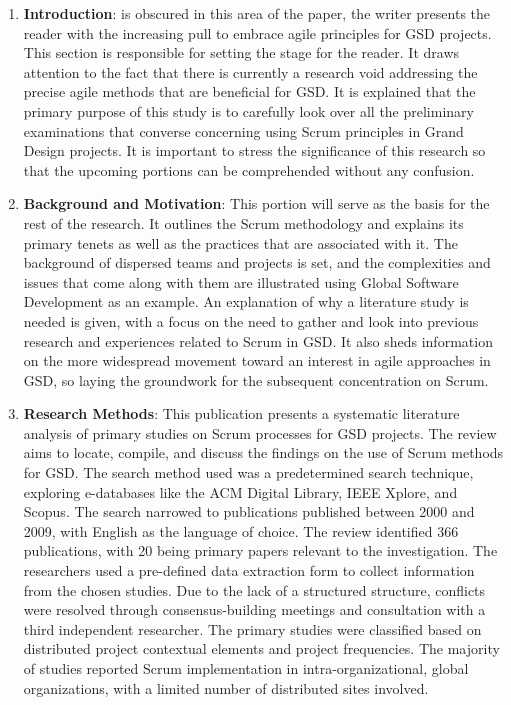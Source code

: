 \documentclass[conference]{IEEEtran}
\begin{document}
\begin{enumerate}
    \item \textbf{Introduction}: is obscured in this area of the paper, the writer presents the reader with the increasing pull to embrace agile principles for GSD projects. This section is responsible for setting the stage for the reader. It draws attention to the fact that there is currently a research void addressing the precise agile methods that are beneficial for GSD. It is explained that the primary purpose of this study is to carefully look over all the preliminary examinations that converse concerning using Scrum principles in Grand Design projects. It is important to stress the significance of this research so that the upcoming portions can be comprehended without any confusion.
\newline
\item \textbf{Background and Motivation}: This portion will serve as the basis for the rest of the research. It outlines the Scrum methodology and explains its primary tenets as well as the practices that are associated with it. The background of dispersed teams and projects is set, and the complexities and issues that come along with them are illustrated using Global Software Development as an example. An explanation of why a literature study is needed is given, with a focus on the need to gather and look into previous research and experiences related to Scrum in GSD. It also sheds information on the more widespread movement toward an interest in agile approaches in GSD, so laying the groundwork for the subsequent concentration on Scrum.
\newline
\item \textbf{Research Methods}: This publication presents a systematic literature analysis of primary studies on Scrum processes for GSD projects. The review aims to locate, compile, and discuss the findings on the use of Scrum methods for GSD. The search method used was a predetermined search technique, exploring  e-databases like the ACM Digital Library, IEEE Xplore, and Scopus. The search narrowed to publications published between 2000 and 2009, with English as the language of choice. The review identified 366 publications, with 20 being primary papers relevant to the investigation. The researchers used a pre-defined data extraction form to collect information from the chosen studies. Due to the lack of a structured structure, conflicts were resolved through consensus-building meetings and consultation with a third independent researcher. The primary studies were classified based on distributed project contextual elements and project frequencies. The majority of studies reported Scrum implementation in intra-organizational, global organizations, with a limited number of distributed sites involved.


\end{enumerate}
\end{document}
